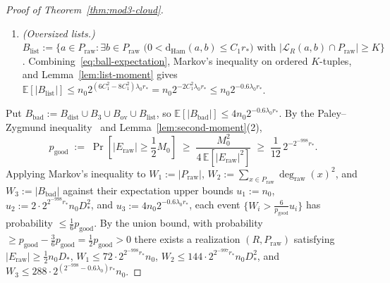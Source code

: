 \documentclass[11pt]{article}
\theoremstyle{definition}
\theoremstyle{remark}
\newcommand{\Ham}{\mathrm{Ham}}
\newcommand{\dHam}{\mathrm{d}_{\Ham}}
\begin{document}
\begin{proof}[Proof of Theorem~\ref{thm:mod3-cloud}]
\begin{enumerate}[label=(\arabic*),leftmargin=2em]
  \item \emph{(Oversized lists.)} $B_{\mathrm{list}} := \bigl\{a \in P_{\mathrm{raw}} : \exists b \in P_{\mathrm{raw}} \text{ ($0 < \dHam(a, b) \le C_1 r_*$) with } |\mathcal{L}_R(a, b) \cap P_{\mathrm{raw}}| \ge K\bigr\}$. Combining~\eqref{eq:ball-expectation}, Markov's inequality on ordered $K$-tuples, and Lemma~\ref{lem:list-moment} gives $\mathbb{E}[|B_{\mathrm{list}}|] \le n_0 2^{(6 C_1^2 - 8 C_1^2)\lambda_0 r_*} = n_0 2^{-2 C_1^2 \lambda_0 r_*} \le n_0 2^{-0.6\lambda_0 r_*}$.
\end{enumerate}

Put $B_{\mathrm{bad}} := B_{\mathrm{dist}} \cup B_3 \cup B_{\mathrm{ov}} \cup B_{\mathrm{list}}$, so $\mathbb{E}[|B_{\mathrm{bad}}|] \le 4 n_0 2^{-0.6\lambda_0 r_*}$. By the Paley--Zygmund inequality~\cite{paley1932some,alon2016probabilistic} and Lemma~\ref{lem:second-moment}(2),
\[
p_{\mathrm{good}} \;:=\; \Pr\!\left[|E_{\mathrm{raw}}| \ge \frac{1}{2} M_0\right] \;\ge\; \frac{M_0^2}{4\,\mathbb{E}[|E_{\mathrm{raw}}|^2]} \;\ge\; \frac{1}{12}\,2^{-2^{-998} r_*}.
\]
Applying Markov's inequality to $W_1 := |P_{\mathrm{raw}}|$, $W_2 := \sum_{x \in P_{\mathrm{raw}}} \deg_{\mathrm{raw}}(x)^2$, and $W_3 := |B_{\mathrm{bad}}|$ against their expectation upper bounds $u_1 := n_0$, $u_2 := 2 \cdot 2^{2^{-998} r_*} n_0 D_*^2$, and $u_3 := 4 n_0 2^{-0.6\lambda_0 r_*}$, each event $\{W_i > \frac{6}{p_{\mathrm{good}}} u_i\}$ has probability $\le \frac{1}{6} p_{\mathrm{good}}$. By the union bound, with probability $\ge p_{\mathrm{good}} - \frac{3}{6} p_{\mathrm{good}} = \frac{1}{2} p_{\mathrm{good}} > 0$ there exists a realization $(R, P_{\mathrm{raw}})$ satisfying $|E_{\mathrm{raw}}| \ge \frac{1}{2} n_0 D_*$, $W_1 \le 72 \cdot 2^{2^{-998} r_*} n_0$, $W_2 \le 144 \cdot 2^{2^{-997} r_*} n_0 D_*^2$, and $W_3 \le 288 \cdot 2^{(2^{-998} - 0.6\lambda_0) r_*} n_0$.


\end{proof}
\end{document}
